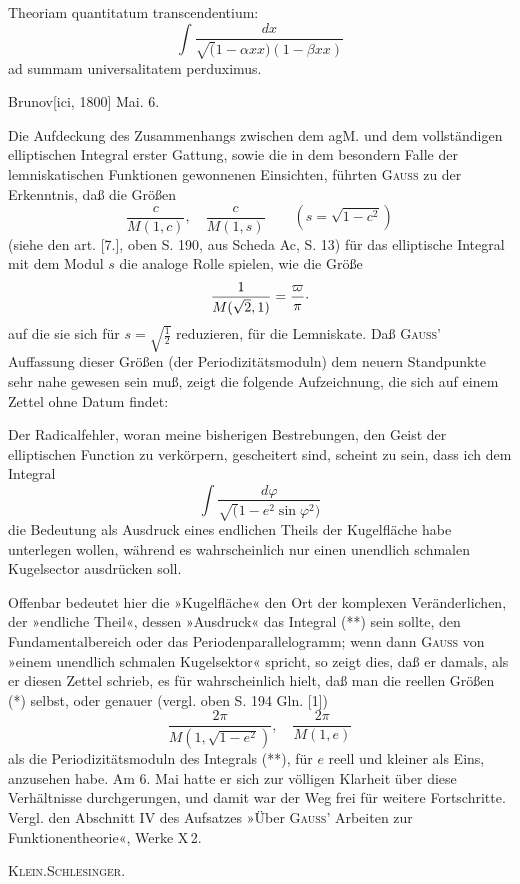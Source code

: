 \clearpage{}
\indent Theoriam quantitatum transcendentium:
\[
\int\frac{dx}{\surd(1-\alpha xx)(1-\beta xx)}
\]
\noindent ad summam universalitatem perduximus.
\par\noindent\hfill Brunov[ici, 1800] Mai. 6.

\medskip\begingroup\small
\makeatletter\tagsleft@true\let\veqno\@@leqno\makeatother
\indent Die Aufdeckung des Zusammenhangs zwischen dem agM. und dem vollständigen elliptischen Integral erster Gattung, sowie die in dem besondern Falle der lemniskatischen Funktionen gewonnenen Einsichten, führten \textsc{Gauss} zu der Erkenntnis, daß die Größen
\begin{equation*}
\tag*{(*)}\frac c{M(1,c)},\quad\frac c{M(1,s)}\qquad(s=\sqrt{1-c^2})
\end{equation*}
\noindent (siehe den art. [7.], oben S. 190, aus Scheda Ac, S. 13) für das elliptische Integral mit dem Modul \(s\) die analoge Rolle spielen, wie die Größe
\[
\frac1{M(\sqrt2,1)}=\frac\varpi\pi\mathpunct{\raisebox{.35ex}{.}}
\]
\noindent auf die sie sich für \(s=\sqrt{\frac12}\) reduzieren, für die Lemniskate. Daß \textsc{Gauss}’ Auffassung dieser Größen (der Periodizitätsmoduln) dem neuern Standpunkte sehr nahe gewesen sein muß, zeigt die folgende Aufzeichnung, die sich auf einem Zettel ohne Datum findet:
\par\begingroup\normalsize
\indent Der Radicalfehler, woran meine bisherigen Bestrebungen, den Geist der elliptischen Function zu verkörpern, gescheitert sind, scheint  zu sein, dass ich dem Integral
\begin{equation*}
\tag*{(**)}\int\frac{d\varphi}{\surd(1-e^2\sin\varphi^2)}
\end{equation*}
\noindent die Bedeutung als Ausdruck eines endlichen Theils der Kugelfläche habe unterlegen wollen, während es wahrscheinlich nur einen unendlich schmalen Kugelsector ausdrücken soll.
\par\endgroup
\indent Offenbar bedeutet hier die »Kugelfläche« den Ort der komplexen Veränderlichen, der »endliche Theil«, dessen »Ausdruck« das Integral (**) sein sollte, den Fundamentalbereich oder das Periodenparallelogramm; wenn dann \textsc{Gauss} von »einem unendlich schmalen Kugelsektor« spricht, so zeigt dies, daß er damals, als er diesen Zettel schrieb, es für wahrscheinlich hielt, daß man die reellen Größen (*) selbst, oder genauer (vergl. oben S. 194 Gln. [1])
\[
\frac{2\pi}{M(1,\sqrt{1-e^2})},\quad\frac{2\pi}{M(1,e)}
\]
\noindent als die Periodizitätsmoduln des Integrals (**), für \(e\) reell und kleiner als Eins, anzusehen habe. Am 6. Mai hatte er sich zur völligen Klarheit über diese Verhältnisse durchgerungen, und damit war der Weg frei für weitere Fortschritte. Vergl. den Abschnitt IV des Aufsatzes »Über \textsc{Gauss}’ Arbeiten zur Funktionentheorie«, Werke X\,2.
\par\noindent\hfill\textsc{Klein.\quad Schlesinger.}
\par\endgroup
